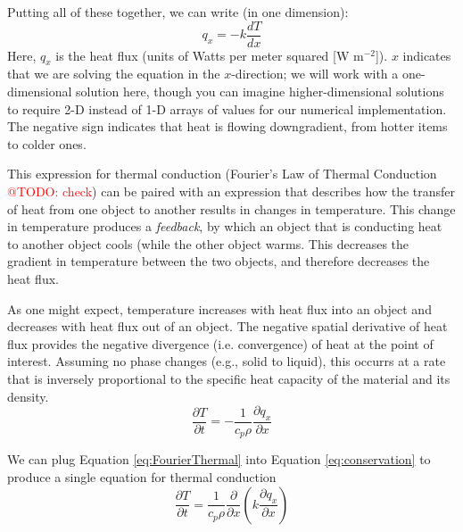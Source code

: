\documentclass[a4paper,10pt]{scrartcl}
\makeatletter
\newcommand{\todo}[1]{\textcolor{red}{@TODO: #1}}
\makeatother
\begin{document}
Putting all of these together, we can write (in one dimension):
\begin{equation}
 q_x = -k \frac{d T}{d x}
 \label{eq:FourierThermal}
\end{equation}
Here, $q_x$ is the heat flux (units of Watts per meter squared [W m$^{-2}$]). $x$ indicates that we are solving the equation in the $x$-direction; we will work with a one-dimensional solution here, though you can imagine higher-dimensional solutions to require 2-D instead of 1-D arrays of values for our numerical implementation. The negative sign indicates that heat is flowing downgradient, from hotter items to colder ones.

This expression for thermal conduction (Fourier's Law of Thermal Conduction \todo{check}) can be paired with an expression that describes how the transfer of heat from one object to another results in changes in temperature. This change in temperature produces a \textit{feedback}, by which an object that is conducting heat to another object cools (while the other object warms. This decreases the gradient in temperature between the two objects, and therefore decreases the heat flux.

As one might expect, temperature increases with heat flux into an object and decreases with heat flux out of an object. The negative spatial derivative of heat flux provides the negative divergence (i.e. convergence) of heat at the point of interest. Assuming no phase changes (e.g., solid to liquid), this occurrs at a rate that is inversely proportional to the specific heat capacity of the material and its density.
\begin{equation}
 \frac{\partial T}{\partial t} = -\frac{1}{c_p \rho} \frac{\partial q_x}{\partial x}
 \label{eq:conservation}
\end{equation}

We can plug Equation \ref{eq:FourierThermal} into Equation \ref{eq:conservation} to produce a single equation for thermal conduction
\begin{equation}
 \frac{\partial T}{\partial t} = \frac{1}{c_p \rho} \frac{\partial}{\partial x} \left( k \frac{\partial q_x}{\partial x} \right)
\end{equation}
\end{document}
